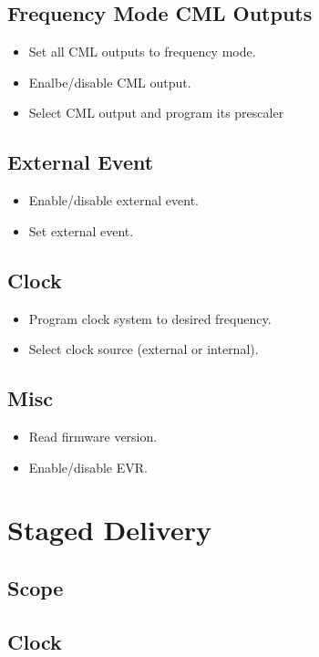 \documentclass[a4paper,10pt]{article}
\begin{document}
	\subsection{Frequency Mode CML Outputs}
	\begin{itemize}
		\item Set all CML outputs to frequency mode.
		\item Enalbe/disable CML output.
		\item Select CML output and program its prescaler
	\end{itemize}

	\subsection{External Event}
	\begin{itemize}
		\item Enable/disable external event.
		\item Set external event.
	\end{itemize}

	\subsection{Clock}
	\begin{itemize}
		\item Program clock system to desired frequency.
		\item Select clock source (external or internal).
	\end{itemize}

	\subsection{Misc}
	\begin{itemize}
		\item Read firmware version.
		\item Enable/disable EVR.
	\end{itemize}

\section{Staged Delivery}
	\subsection{Scope}
	\subsection{Clock}
\end{document}
